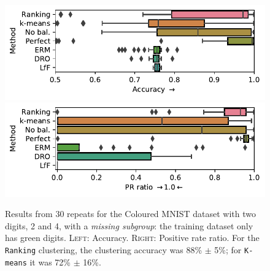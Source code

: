 \begin{figure}[ht]
  \centering
  \includegraphics[width=\columnwidth]{paper3/figures/cmnist_2v4_miss_s_acc.pdf}
  \includegraphics[width=\columnwidth]{paper3/figures/cmnist_2v4_miss_s_prr.pdf}
  \caption{
    Results from 30 repeats for the Coloured MNIST dataset with two digits, 2 and 4, with a \emph{missing subgroup}: the training dataset only has {\color{green}green} digits.
    \textsc{Left}: Accuracy.
    \textsc{Right}: Positive rate ratio.
    For the \texttt{Ranking} clustering, the clustering accuracy was 88\% $\pm$ 5\%;
    for \texttt{K-means} it was 72\% $\pm$ 16\%.
  }%
  \label{fig:cmnist-2v4-miss-s}
\end{figure}
